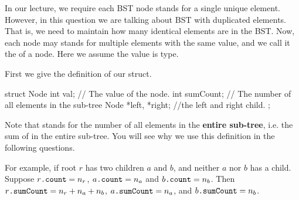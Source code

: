 
In our lecture, we require each BST node stands for a single unique element. However, in this question we are talking about BST with duplicated elements. That is, we need to maintain how many identical elements are in the BST. Now, each node may stands for multiple elements with the same value, and we call it the  of a node. Here we assume the value is  type. 

First we give the definition of our  struct.

\begin{cpp}
struct Node {
    int val;    // The value of the node.
    int sumCount;    // The number of all elements in the sub-tree
    Node *left, *right; //the left and right child.
};
\end{cpp}

Note that  stands for the number of all elements in the \textbf{entire sub-tree}, i.e. the sum of  in the entire sub-tree. You will see why we use this definition in the following questions.

For example, if root $r$ has two children $a$ and $b$, and neither $a$ nor $b$ has a child. Suppose $r\texttt{.count}=n_r$, $a\texttt{.count}=n_a$ and $b\texttt{.count}=n_b$. Then $r\texttt{.sumCount}=n_r+n_a+n_b$, $a\texttt{.sumCount}=n_a$, and $b\texttt{.sumCount}=n_b$.

